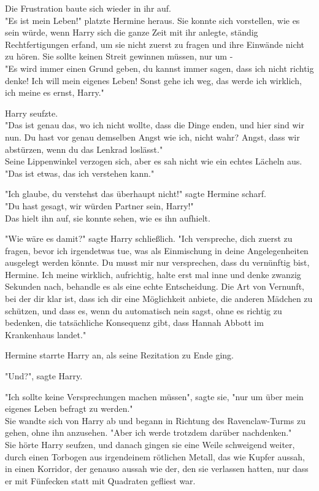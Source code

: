 {Die Frustration baute sich wieder in ihr auf.\\ "Es ist mein Leben!" platzte Hermine heraus. Sie konnte sich vorstellen, wie es sein würde, wenn Harry sich die ganze Zeit mit ihr anlegte, ständig Rechtfertigungen erfand, um sie nicht zuerst zu fragen und ihre Einwände nicht zu hören. Sie sollte keinen Streit gewinnen müssen, nur um -\\ "Es wird immer einen Grund geben, du kannst immer sagen, dass ich nicht richtig denke! Ich will mein eigenes Leben! Sonst gehe ich weg, das werde ich wirklich, ich meine es ernst, Harry."

Harry seufzte.\\ "Das ist genau das, wo ich nicht wollte, dass die Dinge enden, und hier sind wir nun. Du hast vor genau demselben Angst wie ich, nicht wahr? Angst, dass wir abstürzen, wenn du das Lenkrad loslässt."\\ Seine Lippenwinkel verzogen sich, aber es sah nicht wie ein echtes Lächeln aus.\\ "Das ist etwas, das ich verstehen kann."

"Ich glaube, du verstehst das überhaupt nicht!" sagte Hermine scharf.\\ "Du hast gesagt, wir würden Partner sein, Harry!"\\ Das hielt ihn auf, sie konnte sehen, wie es ihn aufhielt.

"Wie wäre es damit?" sagte Harry schließlich. "Ich verspreche, dich zuerst zu fragen, bevor ich irgendetwas tue, was als Einmischung in deine Angelegenheiten ausgelegt werden könnte. Du musst mir nur versprechen, dass du vernünftig bist, Hermine. Ich meine wirklich, aufrichtig, halte erst mal inne und denke zwanzig Sekunden nach, behandle es als eine echte Entscheidung. Die Art von Vernunft, bei der dir klar ist, dass ich dir eine Möglichkeit anbiete, die anderen Mädchen zu schützen, und dass es, wenn du automatisch nein sagst, ohne es richtig zu bedenken, die tatsächliche Konsequenz gibt, dass Hannah Abbott im Krankenhaus landet."

Hermine starrte Harry an, als seine Rezitation zu Ende ging.

"Und?", sagte Harry.

"Ich sollte keine Versprechungen machen müssen", sagte sie, "nur um über mein eigenes Leben befragt zu werden."\\ Sie wandte sich von Harry ab und begann in Richtung des Ravenclaw-Turms zu gehen, ohne ihn anzusehen. "Aber ich werde trotzdem darüber nachdenken."\\ Sie hörte Harry seufzen, und danach gingen sie eine Weile schweigend weiter, durch einen Torbogen aus irgendeinem rötlichen Metall, das wie Kupfer aussah, in einen Korridor, der genauso aussah wie der, den sie verlassen hatten, nur dass er mit Fünfecken statt mit Quadraten gefliest war.

}
